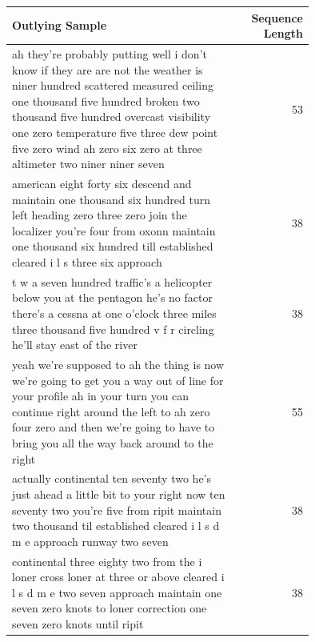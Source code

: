 \documentclass[12pt]{article}
\begin{document}
\begin{table}
    \centering
    \begin{tabular}{p{0.75\linewidth} r}
        \toprule
        Outlying Sample                                                                                                                                                                                                                                                                                                             & Sequence Length \\
        \midrule
        ah they're probably putting well i don't know if they are are not the weather is niner hundred scattered measured ceiling one thousand five hundred broken two thousand five hundred overcast visibility one zero temperature five three dew point five zero wind ah zero six zero at three altimeter two niner niner seven & 53              \\
        \midrule
        american eight forty six descend and maintain one thousand six hundred turn left heading zero three zero join the localizer you're four from oxonn maintain one thousand six hundred till established cleared i l s three six approach                                                                                      & 38              \\
        \midrule
        t w a seven hundred traffic's a helicopter below you at the pentagon he's no factor there's a cessna at one o'clock three miles three thousand five hundred v f r circling he'll stay east of the river                                                                                                                     & 38              \\
        \midrule
        yeah we're supposed to ah the thing is now we're going to get you a way out of line for your profile ah in your turn you can continue right around the left to ah zero four zero and then we're going to have to bring you all the way back around to the right                                                             & 55              \\
        \midrule
        actually continental ten seventy two he's just ahead a little bit to your right now ten seventy two you're five from ripit maintain two thousand til established cleared i l s d m e approach runway two seven                                                                                                              & 38              \\
        \midrule
        continental three eighty two from the i loner cross loner at three or above cleared i l s d m e two seven approach maintain one seven zero knots to loner correction one seven zero knots until ripit                                                                                                                       & 38              \\

\end{tabular}
\end{table}
\end{document}
